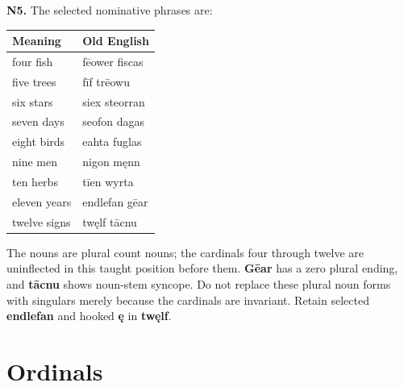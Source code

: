 \par\begin{minipage}{\linewidth}\raggedright
\textbf{N5.} The selected nominative phrases are:

\par\begingroup
\fontsize{10.5}{13.2}\selectfont
\setlength{\LTleft}{0pt}\setlength{\LTright}{\fill}
\noindent
\begin{tabular}{@{}>{\raggedright\arraybackslash}p{59.85mm}>{\raggedright\arraybackslash}p{61.34mm}@{}}
\toprule
\textbf{Meaning} & \textbf{Old English} \\
\midrule
four fish & fēower fiscas \\
five trees & fīf trēowu \\
six stars & siex steorran \\
seven days & seofon dagas \\
eight birds & eahta fuglas \\
nine men & nigon męnn \\
ten herbs & tīen wyrta \\
eleven years & endlefan gēar \\
twelve signs & twęlf tācnu \\
\bottomrule
\end{tabular}
\par\endgroup

The nouns are plural count nouns; the cardinals four through twelve are uninflected in this taught position before them. \textbf{Gēar} has a zero plural ending, and \textbf{tācnu} shows noun-stem syncope. Do not replace these plural noun forms with singulars merely because the cardinals are invariant. Retain selected \textbf{endlefan} and hooked \textbf{ę} in \textbf{twęlf}.

\end{minipage}\par\addvspace{4pt}

\section*{Ordinals}

